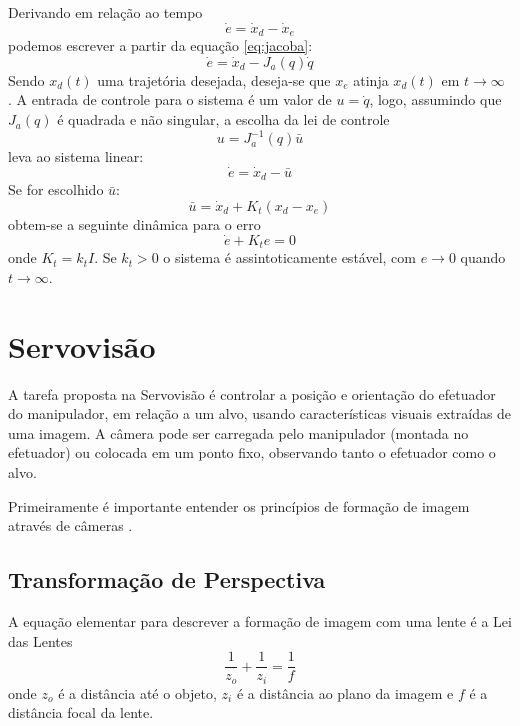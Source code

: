 Derivando em relação ao tempo
\begin{equation}
{\dot{e}} = {\dot{x}}_d - {\dot{x}_e}
\end{equation}
podemos escrever a partir da equação \ref{eq:jacoba}:
\begin{equation}
{\dot{e}} = {\dot{x}}_d - {J}_a({q})\dot{{q}}
\end{equation}
Sendo ${x}_d(t)$ uma trajetória desejada, deseja-se que ${x}_e$ atinja ${x}_d(t)$ em $t \to \infty$ .
A entrada de controle para o sistema é um valor de ${u} = \dot{{q}}$, logo, assumindo que ${J}_a({q})$ é quadrada e não singular, a escolha da lei de controle
\begin{equation}
{u} = {J}_a^{-1}({q})\bar{{u}}
\end{equation}
leva ao sistema linear:
\begin{equation}
\dot{{e}} = \dot{{x}}_d - \bar{{u}}
\end{equation}
Se for escolhido $\bar{{u}}$:
\begin{equation}
\bar{{u}} = \dot{{x}}_d + {K_t} ({x}_d - {x}_e)
\end{equation}
obtem-se a seguinte dinâmica para o erro
\begin{equation}
\dot{{e}} + {K_t} {e} = 0
\end{equation}
onde $K_t = k_t I$. Se $k_t > 0$ o sistema é assintoticamente estável, com $e \rightarrow 0$ quando $t \to \infty$.

\section{Servovisão}
A tarefa proposta na Servovisão é controlar a posição e orientação do efetuador do manipulador, em relação a um alvo, usando características visuais extraídas de uma imagem. A câmera pode ser carregada pelo manipulador (montada no efetuador) ou colocada em um ponto fixo, observando tanto o efetuador como o alvo.

Primeiramente é importante entender os princípios de formação de imagem através de câmeras \citep{petercorke}. 

\subsection{Transformação de Perspectiva} \label{sec:camera_model}
A equação elementar para descrever a formação de imagem com uma lente é a Lei das Lentes
\begin{equation} 
\frac{1}{z_o} + \frac{1}{z_i} = \frac{1}{f}
\end{equation} 
onde $z_o$ é a distância até o objeto, $z_i$ é a distância ao plano da imagem e $f$ é a distância focal da lente.

